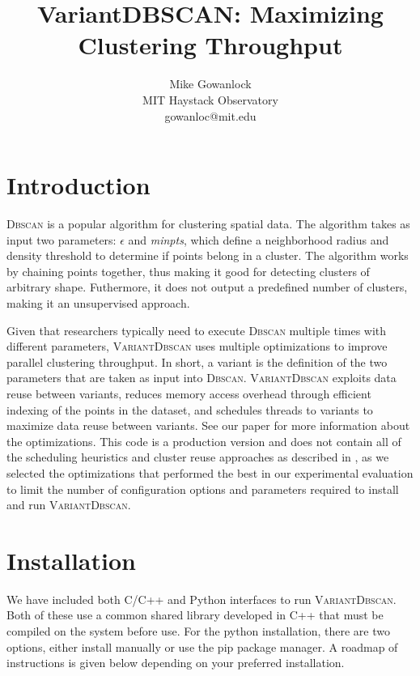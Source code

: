 \documentclass[12pt]{article}
\def\eps{$\epsilon$\xspace}
\def\minpts{\emph{minpts}\xspace}
\def\dbscan{\textsc{Dbscan}\xspace}
\def\vdbscan{\textsc{VariantDbscan}\xspace}
\begin{document}
\title{VariantDBSCAN: Maximizing Clustering Throughput}
\author{Mike Gowanlock\\ MIT Haystack Observatory\\ gowanloc@mit.edu}
\date{}
\maketitle

\tableofcontents

\section{Introduction}
\dbscan \cite{ester1996density} is a popular algorithm for clustering spatial data. The algorithm takes as input two parameters: \eps and \minpts, which define a neighborhood radius and density threshold to determine if points belong in a cluster.  The algorithm works by chaining points together, thus making it good for detecting clusters of arbitrary shape. Futhermore, it does not output a predefined number of clusters, making it an unsupervised approach.

Given that researchers typically need to execute \dbscan multiple times with different parameters, \vdbscan uses multiple optimizations to improve parallel clustering throughput.  In short, a variant is the definition of the two parameters that are taken as input into \dbscan. \vdbscan exploits data reuse between variants, reduces memory access overhead through efficient indexing of the points in the dataset, and schedules threads to variants to maximize data reuse between variants. See our paper \cite{Gowanlock2016} for more information about the optimizations. This code is a production version and does not contain all of the scheduling heuristics and cluster reuse approaches as described in \cite{Gowanlock2016}, as we selected the optimizations that performed the best in our experimental evaluation to limit the number of configuration options and parameters required to install and run \vdbscan.


\section{Installation}
We have included both C/C++ and Python interfaces to run \vdbscan.  Both of these use a common shared library developed in C++ that must be compiled on the system before use. For the python installation, there are two options, either install manually or use the pip package manager. A roadmap of instructions is given below depending on your preferred installation.
\end{document}
